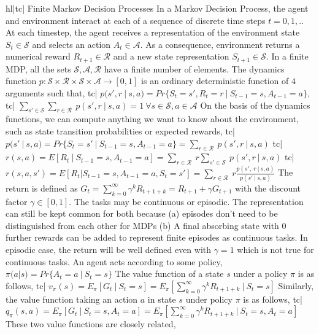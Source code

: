 hl|tc| Finite Markov Decision Processes
In a Markov Decision Process, the agent and environment interact at each of a sequence of discrete time steps \( t=0,1,.. \)
At each timestep, the agent receives a representation of the environment state \( S_t \in \mathcal{S} \) and selects an action \( A_t \in \mathcal{A} \). As a consequence, environment returns a numerical reward \( R_{t+1} \in \mathcal{R} \) and a new state representation \( S_{t+1} \in \mathcal{S} \).
In a finite MDP, all the sets \( \mathcal{S, A, R} \) have a finite number of elements.
The dynamics function \( p: \mathcal{S \times R \times S \times A} \rightarrow [0,1] \) is an ordinary deterministic function of \( 4 \) arguments such that,
tc| \( p(s', r \ | \ s, a) = Pr\{S_t = s', R_t = r \ | \ S_{t-1} = s, A_{t - 1} = a \}, \)
tc| \( \sum_{s' \in \mathcal{S}} \sum_{r \in \mathcal{R}} \ p(s', r \ | \ s, a) = 1 \ \forall s \in \mathcal{S}, a \in \mathcal{A} \)
On the basis of the dynamics functions, we can compute anything we want to know about the environment, such as state transition probabilities or expected rewards,
tc| \( p(s' \ | \ s, a) =Pr\{ S_t = s' \ | \ S_{t-1} = s, A_{t-1} = a \} = \sum_{r \in \mathcal{R}} \ p(s', r \ | \ s, a) \)
tc| \( r(s, a) = E[R_t \ | \ S_{t-1} = s, A_{t-1} = a] = \sum_{r \in \mathcal{R}} \ r \sum_{s' \in \mathcal{S}} \ p(s', r \ | \ s,a) \)
tc| \( r(s, a, s') = E[R_t | S_{t-1} = s, A_{t-1} = a, S_t = s'] = \sum_{r \in \mathcal{R}} \ r \frac{p(s', \ r \ | \ s, a)}{p(s' \ | \ s, a)} \)
The return is defined as \( G_t = \sum_{k=0}^\infty \gamma^k R_{t + 1 + k} = R_{t+1} + \gamma G_{t+1} \) with the discount factor \( \gamma \in [0,1] \).
The tasks may be continuous or episodic. The representation can still be kept common for both because (a) episodes don't need to be distinguished from each other for MDPs (b) A final absorbing state with 0 further rewards can be added to represent finite episodes as continuous tasks. In episodic case, the return will be well defined even with \( \gamma = 1 \) which is not true for continuous tasks.
An agent acts according to some policy, \( \pi(a|s) = Pr \{ A_t = a \ | \ S_t = s \} \)
The value function of a state \( s \) under a policy \( \pi \) is as follows,
tc| \( v_\pi(s) = E_\pi[ G_t \ | \ S_t = s ] = E_\pi[ \sum_{k=0}^\infty \gamma^k R_{t + 1 + k} \ | \ S_t = s] \)
Similarly, the value function taking an action \( a \) in state \( s \) under policy \( \pi \) is as follows,
tc| \( q_\pi(s, a) = E_\pi[G_{t} \ | \ S_t = s, A_t = a ] = E_\pi[ \sum_{k=0}^\infty \gamma^k R_{t+1+k} \ | \ S_t = s, A_t = a ] \)
These two value functions are closely related,
